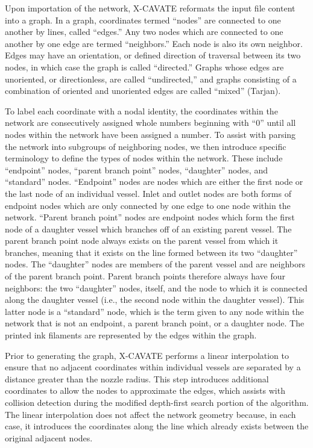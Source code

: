 \documentclass[11pt,letterpaper]{article}
\begin{document}
Upon importation of the network, X-CAVATE reformats the input file content into
a graph. In a graph, coordinates termed ``nodes'' are connected to one another
by lines, called ``edges.'' Any two nodes which are connected to one another by
one edge are termed ``neighbors.'' Each node is also its own neighbor. Edges
may have an orientation, or defined direction of traversal between its two
nodes, in which case the graph is called ``directed.'' Graphs whose edges are
unoriented, or directionless, are called ``undirected,'' and graphs consisting
of a combination of oriented and unoriented edges are called ``mixed'' (Tarjan).

To label each coordinate with a nodal identity, the coordinates within the
network are consecutively assigned whole numbers beginning with ``0'' until all
nodes within the network have been assigned a number. To assist with parsing the
network into subgroups of neighboring nodes, we then introduce specific
terminology to define the types of nodes within the network. These include
``endpoint'' nodes, ``parent branch point'' nodes, ``daughter'' nodes, and
``standard'' nodes. ``Endpoint'' nodes are nodes which are either
the first node or the last node of an individual vessel. Inlet and outlet nodes
are both forms of endpoint nodes which are only connected by one edge to one
node within the network. ``Parent branch point'' nodes are endpoint nodes which
form the first node of a daughter vessel which branches off of an existing
parent vessel. The parent branch point node always exists on the parent vessel
from which it branches, meaning that it exists on the line formed between its
two ``daughter'' nodes. The ``daughter'' nodes are members of the parent vessel
and are neighbors of the parent branch point. Parent branch points therefore
always have four neighbors: the two ``daughter'' nodes, itself, and the node to
which it is connected along the daughter vessel (i.e., the second node within
the daughter vessel). This latter node is a ``standard'' node, which is the
term given to any node within the network that is not an endpoint, a parent
branch point, or a daughter node. The printed ink filaments are represented by
the edges within the graph.

Prior to generating the graph, X-CAVATE performs a linear interpolation to
ensure that no adjacent coordinates within individual vessels are separated by
a distance greater than the nozzle radius. This step introduces additional
coordinates to allow the nodes to approximate the edges, which assists with
collision detection during the modified depth-first search portion of the
algorithm. The linear interpolation does not affect the network geometry
because, in each case, it introduces the coordinates along the line which
already exists between the original adjacent nodes.
\end{document}
